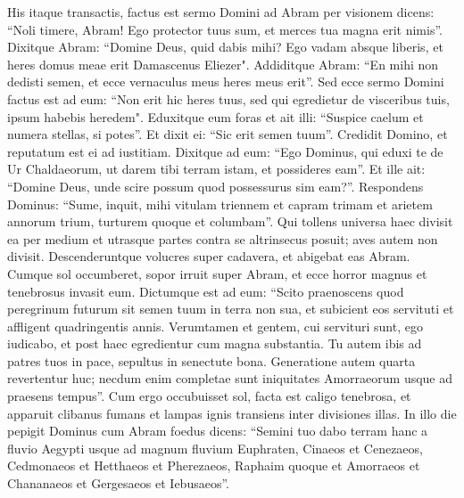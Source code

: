\begin{biblechapter}  
\verse His itaque transactis, factus est sermo Domini ad Abram per visionem dicens: “Noli timere, Abram! Ego protector tuus sum, et merces tua magna erit nimis”. 
\verse Dixitque Abram: “Domine Deus, quid dabis mihi? Ego vadam absque liberis, et heres domus meae erit Damascenus Eliezer". 
\verse Addiditque Abram: “En mihi non dedisti semen, et ecce vernaculus meus heres meus erit”. 
\verse Sed ecce sermo Domini factus est ad eum: “Non erit hic heres tuus, sed qui egredietur de visceribus tuis, ipsum habebis heredem". 
\verse Eduxitque eum foras et ait illi: “Suspice caelum et numera stellas, si potes”. Et dixit ei: “Sic erit semen tuum”. 
\verse Credidit Domino, et reputatum est ei ad iustitiam. 
\verse Dixitque ad eum: “Ego Dominus, qui eduxi te de Ur Chaldaeorum, ut darem tibi terram istam, et possideres eam”. 
\verse Et ille ait: “Domine Deus, unde scire possum quod possessurus sim eam?”. 
\verse Respondens Dominus: “Sume, inquit, mihi vitulam triennem et capram trimam et arietem annorum trium, turturem quoque et columbam”. 
\verse Qui tollens universa haec divisit ea per medium et utrasque partes contra se altrinsecus posuit; aves autem non divisit. 
\verse Descenderuntque volucres super cadavera, et abigebat eas Abram. 
\verse Cumque sol occumberet, sopor irruit super Abram, et ecce horror magnus et tenebrosus invasit eum. 
\verse Dictumque est ad eum: “Scito praenoscens quod peregrinum futurum sit semen tuum in terra non sua, et subicient eos servituti et affligent quadringentis annis. 
\verse Verumtamen et gentem, cui servituri sunt, ego iudicabo, et post haec egredientur cum magna substantia. 
\verse Tu autem ibis ad patres tuos in pace, sepultus in senectute bona. 
\verse Generatione autem quarta revertentur huc; necdum enim completae sunt iniquitates Amorraeorum usque ad praesens tempus”. 
\verse Cum ergo occubuisset sol, facta est caligo tenebrosa, et apparuit clibanus fumans et lampas ignis transiens inter divisiones illas. 
\verse In illo die pepigit Dominus cum Abram foedus dicens: “Semini tuo dabo terram hanc a fluvio Aegypti usque ad magnum fluvium Euphraten, 
\verse Cinaeos et Cenezaeos, Cedmonaeos 
\verse et Hetthaeos et Pherezaeos, Raphaim quoque 
\verse et Amorraeos et Chananaeos et Gergesaeos et Iebusaeos”. 
\end{biblechapter}

